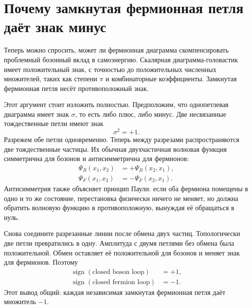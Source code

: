 \section{Почему замкнутая фермионная петля даёт знак минус}

Теперь можно спросить, может ли фермионная диаграмма скомпенсировать проблемный бозонный вклад в самоэнергию. Скалярная диаграмма-головастик имеет положительный знак, с точностью до положительных численных множителей, таких как степени \(\pi\) и комбинаторные коэффициенты. Замкнутая фермионная петля несёт противоположный знак.

\begin{classroomqa}
\end{classroomqa}

Этот аргумент стоит изложить полностью. Предположим, что однопетлевая диаграмма имеет знак \(\sigma\), то есть либо плюс, либо минус. Две несвязанные тождественные петли имеют знак
\begin{equation}
\sigma^2=+1.
\end{equation}
Разрежем обе петли одновременно. Теперь между разрезами распространяются две тождественные частицы. Их обычная двухчастичная волновая функция симметрична для бозонов и антисимметрична для фермионов:
\begin{align}
\Psi_B(x_1,x_2)&=+\Psi_B(x_2,x_1),\\
\Psi_F(x_1,x_2)&=-\Psi_F(x_2,x_1).
\end{align}
Антисимметрия также объясняет принцип Паули: если оба фермиона помещены в одно и то же состояние, перестановка физически ничего не меняет, но должна обратить волновую функцию в противоположную, вынуждая её обращаться в нуль.

Снова соедините разрезанные линии после обмена двух частиц. Топологически две петли превратились в одну. Амплитуда с двумя петлями без обмена была положительной. Обмен оставляет её положительной для бозонов и меняет знак для фермионов. Поэтому
\begin{equation}
\begin{aligned}
\operatorname{sign}(\text{closed boson loop})&=+1,\\
\operatorname{sign}(\text{closed fermion loop})&=-1.
\end{aligned}
\end{equation}
Этот вывод общий: каждая независимая замкнутая фермионная петля даёт множитель \(-1\).

